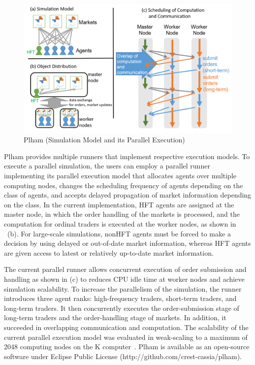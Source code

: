 \begin{figure}[t]
  \centering
  \includegraphics[width=.8\linewidth]{Figs.kamada/plham.png}
  \caption{Plham (Simulation Model and its Parallel Execution)}
  \label{fig:Figs.kamada/plham}
\end{figure}

Plham provides multiple runners that implement respective execution models.
To execute a parallel simulation, the users can employ a parallel runner implementing its parallel execution model that allocates agents over multiple computing nodes,
changes the scheduling frequency of agents depending on the class of agents, and accepts delayed propagation of market information depending on the class.
In the current implementation, 
HFT agents are assigned at the master node, in which the order handling of the markets is processed,
and the computation for ordinal traders is executed at the worker nodes, as shown in ~(b).
For large-scale simulations, nonHFT agents must be forced to make a decision by using delayed or out-of-date market information, whereas HFT agents are given access to latest or relatively up-to-date market information.

The current parallel runner allows concurrent execution of order submission and handling as shown in (c) to reduces CPU idle time at worker nodes and achieve simulation scalability.
To increase the parallelism of the simulation, the runner introduces three agent ranks: high-frequency traders, short-term traders, and long-term traders.
It then concurrently executes the order-submission stage of long-term traders and the order-handling stage of markets. 
In addition, it succeeded in overlapping communication and computation.
The scalability of the current parallel execution model was evaluated in weak-scaling to a maximum of 2048 computing nodes on the K computer~\cite{arob17plham}.
Plham is available as an open-source software under Eclipse Public License (http://github.com/crest-cassia/plham).

